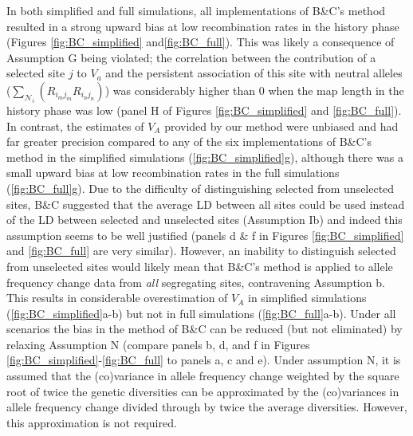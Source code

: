 \documentclass[12pt]{article}
\begin{document}
\begin{bibunit}
In both simplified and full simulations, all implementations of B\&C's method resulted in a strong upward bias at low recombination rates in the history phase (Figures \ref{fig:BC_simplified} and\ref{fig:BC_full}). This was likely a consequence of Assumption G being violated; the correlation between the contribution of a selected site $j$ to $V_a$ and the persistent association of this site with neutral alleles ($\sum_{ \mathcal{N}_i}(R_{{i_m}{j_m}}R_{{i_n}{j_n}})$) was considerably higher than 0 when the map length in the history phase was low (panel H of Figures \ref{fig:BC_simplified} and \ref{fig:BC_full}). In contrast, the estimates of $V_A$ provided by our method were unbiased and had far greater precision compared to any of the six implementations of B\&C's method in the simplified simulations (\ref{fig:BC_simplified}g), although there was a small upward bias at low recombination rates in the full simulations (\ref{fig:BC_full}g). Due to the difficulty of distinguishing selected from unselected sites, B\&C suggested that the average LD between all sites could be used instead of the LD between selected and unselected sites (Assumption Ib) and indeed this assumption seems to be well justified (panels d \& f in Figures \ref{fig:BC_simplified} and \ref{fig:BC_full} are very similar). However, an inability to distinguish selected from unselected sites would likely mean that B\&C's method is applied to allele frequency change data from \emph{all} segregating sites, contravening Assumption b. This results in considerable overestimation of $V_A$ in simplified simulations (\ref{fig:BC_simplified}a-b) but not in full simulations (\ref{fig:BC_full}a-b). Under all scenarios the bias in the method of B\&C can be reduced (but not eliminated) by relaxing Assumption N (compare panels b, d, and f in Figures \ref{fig:BC_simplified}-\ref{fig:BC_full} to panels a, c and e). Under assumption N, it is assumed that the (co)variance in allele frequency change weighted by the square root of twice the genetic diversities can be approximated by the (co)variances in allele frequency change divided through by twice the average diversities. However, this approximation is not required. 


\end{bibunit}
\end{document}
